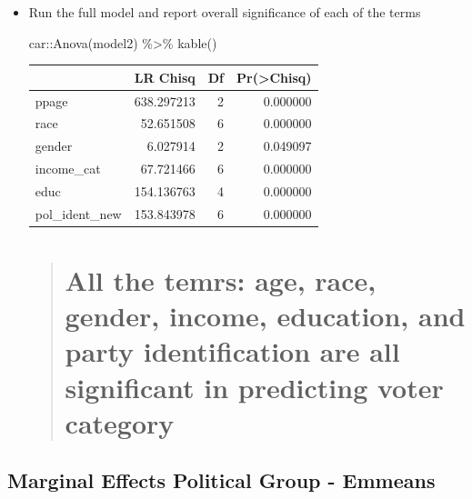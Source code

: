 \documentclass[
  letterpaper,
  DIV=11,
  numbers=noendperiod]{scrartcl}
\newenvironment{Shaded}{\begin{snugshade}}{\end{snugshade}}
\newcommand{\FunctionTok}[1]{\textcolor[rgb]{0.28,0.35,0.67}{#1}}
\newcommand{\NormalTok}[1]{\textcolor[rgb]{0.00,0.23,0.31}{#1}}
\newcommand{\SpecialCharTok}[1]{\textcolor[rgb]{0.37,0.37,0.37}{#1}}
\begin{document}
\begin{itemize}
\item
  Run the full model and report overall significance of each of the
  terms

\begin{Shaded}
\begin{Highlighting}[]
\NormalTok{car}\SpecialCharTok{::}\FunctionTok{Anova}\NormalTok{(model2) }\SpecialCharTok{\%\textgreater{}\%} 
  \FunctionTok{kable}\NormalTok{()}
\end{Highlighting}
\end{Shaded}

  \begin{longtable}[]{@{}lrrr@{}}
  \toprule\noalign{}
  & LR Chisq & Df & Pr(\textgreater Chisq) \\
  \midrule\noalign{}
  \endhead
  \bottomrule\noalign{}
  \endlastfoot
  ppage & 638.297213 & 2 & 0.000000 \\
  race & 52.651508 & 6 & 0.000000 \\
  gender & 6.027914 & 2 & 0.049097 \\
  income\_cat & 67.721466 & 6 & 0.000000 \\
  educ & 154.136763 & 4 & 0.000000 \\
  pol\_ident\_new & 153.843978 & 6 & 0.000000 \\
  \end{longtable}

  \begin{quote}
  \section{All the temrs: age, race, gender, income, education, and
  party identification are all significant in predicting voter
  category}\label{all-the-temrs-age-race-gender-income-education-and-party-identification-are-all-significant-in-predicting-voter-category}
  \end{quote}
\end{itemize}

\subsection{Marginal Effects Political Group -
Emmeans}\label{marginal-effects-political-group---emmeans}
\end{document}
